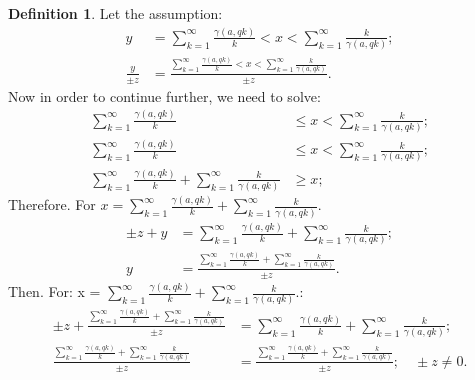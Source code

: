 \documentclass[10pt]{article}
\theoremstyle{plain}
\theoremstyle{definition}
\newtheorem{definition}[theorem]{Definition}
\theoremstyle{remark}
\begin{document}
	\begin{definition}
		Let the assumption:
		\begin{align*}
			y &= \sum_{k=1}^{\infty} \frac{\gamma(a, qk)}{k} < x < \sum_{k=1}^{\infty} \frac{k}{\gamma(a, qk)};\\
			\frac{y}{\pm z} &= \frac{\sum_{k=1}^{\infty} \frac{\gamma(a, qk)}{k} < x < \sum_{k=1}^{\infty} \frac{k}{\gamma(a, qk)}}{\pm z}.
		\end{align*}
		Now in order to continue further, we need to solve:
		\begin{align*}
			\sum_{k=1}^{\infty} \frac{\gamma(a, qk)}{k} &\leq x < \sum_{k=1}^{\infty} \frac{k}{\gamma(a, qk)};\\
			\sum_{k=1}^{\infty} \frac{\gamma(a, qk)}{k} &\leq x < \sum_{k=1}^{\infty} \frac{k}{\gamma(a, qk)};\\
			\sum_{k=1}^{\infty} \frac{\gamma(a, qk)}{k} + \sum_{k=1}^{\infty} \frac{k}{\gamma(a, qk)} &\geq x;
		\end{align*}
		Therefore. For $x = \sum_{k=1}^{\infty} \frac{\gamma(a, qk)}{k} + \sum_{k=1}^{\infty} \frac{k}{\gamma(a, qk)}.$
		\begin{align*}
			\pm z + y &= \sum_{k=1}^{\infty} \frac{\gamma(a, qk)}{k} + \sum_{k=1}^{\infty} \frac{k}{\gamma(a, qk)};\\
			y &= \frac{\sum_{k=1}^{\infty} \frac{\gamma(a, qk)}{k} + \sum_{k=1}^{\infty} \frac{k}{\gamma(a, qk)}}{\pm z}.
		\end{align*}
		Then. For: x = $\sum_{k=1}^{\infty} \frac{\gamma(a, qk)}{k} + \sum_{k=1}^{\infty} \frac{k}{\gamma(a, qk)}.$:
		\begin{align*}
			\pm z + \frac{\sum_{k=1}^{\infty} \frac{\gamma(a, qk)}{k} + \sum_{k=1}^{\infty}\frac{k}{\gamma(a, qk)}}{\pm z} &= \sum_{k=1}^{\infty} \frac{\gamma(a, qk)}{k} + \sum_{k=1}^{\infty}\frac{k}{\gamma(a, qk)};\\
			\frac{\sum_{k=1}^{\infty} \frac{\gamma(a, qk)}{k} + \sum_{k=1}^{\infty} \frac{k}{\gamma(a, qk)}}{\pm z} &= \frac{\sum_{k=1}^{\infty} \frac{\gamma(a, qk)}{k} + \sum_{k=1}^{\infty} \frac{k}{\gamma(a, qk)}}{\pm z}; \quad \pm z \neq 0.
		\end{align*}
	\end{definition}
	
\end{document}
